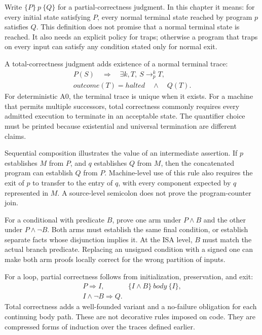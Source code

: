 Write \(\{P\}\ p\ \{Q\}\) for a partial-correctness judgment. In this
chapter it means: for every initial state satisfying \(P\), every normal
terminal state reached by program \(p\) satisfies \(Q\). This definition
does not promise that a normal terminal state is reached. It also needs an
explicit policy for traps; otherwise a program that traps on every input can
satisfy any condition stated only for normal exit.

A total-correctness judgment adds existence of a normal terminal trace:
\[
 \begin{array}{l}
 P(S)\quad\Longrightarrow\quad
 \exists k,T,\ S\mathrel{\to^k_p}T,\\
 \mathit{outcome}(T)=\mathit{halted}
 \quad\mathrel{\land}\quad Q(T).
 \end{array}
\]
For deterministic A0, the terminal trace is unique when it exists. For a
machine that permits multiple successors, total correctness commonly requires every admitted
execution to terminate in an acceptable state. The quantifier choice must be
printed because existential and universal termination are different claims.

Sequential composition illustrates the value of an intermediate assertion.
If \(p\) establishes \(M\) from \(P\), and \(q\) establishes \(Q\) from
\(M\), then the concatenated program can establish \(Q\) from \(P\).
Machine-level use of this rule also requires the exit of \(p\) to transfer to
the entry of \(q\), with every component expected by \(q\) represented in
\(M\). A source-level semicolon does not prove the program-counter join.

For a conditional with predicate \(B\), prove one arm under \(P\land B\)
and the other under \(P\land\neg B\). Both arms must establish the same
final condition, or establish separate facts whose disjunction implies it. At
the ISA level, \(B\) must match the actual branch predicate. Replacing an
unsigned condition with a signed one can make both arm proofs locally correct
for the wrong partition of inputs.

For a loop, partial correctness follows from initialization, preservation, and
exit:
\[
 \begin{array}{ll}
 P\Longrightarrow I, &
 \{I\land B\}\ \mathit{body}\ \{I\},\\
 I\land\neg B\Longrightarrow Q. &
 \end{array}
\]
Total correctness adds a well-founded variant and a no-failure obligation for
each continuing body path. These are not decorative rules imposed on code.
They are compressed forms of induction over the traces defined earlier.

